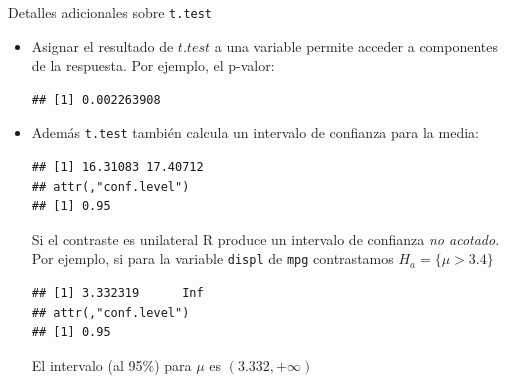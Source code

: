 \documentclass[
  9pt,
  ignorenonframetext,
]{beamer}
\newenvironment{Shaded}{\begin{snugshade}}{\end{snugshade}}
\newcommand{\DataTypeTok}[1]{\textcolor[rgb]{0.13,0.29,0.53}{#1}}
\newcommand{\FloatTok}[1]{\textcolor[rgb]{0.00,0.00,0.81}{#1}}
\newcommand{\KeywordTok}[1]{\textcolor[rgb]{0.13,0.29,0.53}{\textbf{#1}}}
\newcommand{\NormalTok}[1]{#1}
\newcommand{\OperatorTok}[1]{\textcolor[rgb]{0.81,0.36,0.00}{\textbf{#1}}}
\newcommand{\StringTok}[1]{\textcolor[rgb]{0.31,0.60,0.02}{#1}}
\begin{document}
\begin{frame}[fragile]{Detalles adicionales sobre \texttt{t.test}}
\protect\hypertarget{detalles-adicionales-sobre-t.test}{}

\begin{itemize}
\item
  Asignar el resultado de \(t.test\) a una variable permite acceder a
  componentes de la respuesta. Por ejemplo, el p-valor:\small

\begin{Shaded}
\end{Shaded}

\begin{verbatim}
## [1] 0.002263908
\end{verbatim}

  \normalsize
\item
  Además \texttt{t.test} también calcula un intervalo de confianza para
  la media:\small

\begin{Shaded}
\end{Shaded}

\begin{verbatim}
## [1] 16.31083 17.40712
## attr(,"conf.level")
## [1] 0.95
\end{verbatim}

  \normalsize Si el contraste es unilateral R produce un intervalo de
  confianza \emph{no acotado}. Por ejemplo, si para la variable
  \texttt{displ} de \texttt{mpg} contrastamos
  \(H_a = \{\mu > 3.4\}\)\small

\begin{Shaded}
\end{Shaded}

\begin{verbatim}
## [1] 3.332319      Inf
## attr(,"conf.level")
## [1] 0.95
\end{verbatim}

  \normalsize El intervalo (al 95\%) para \(\mu\) es
  \((3.332, +\infty)\)
\end{itemize}

\end{frame}
\end{document}
